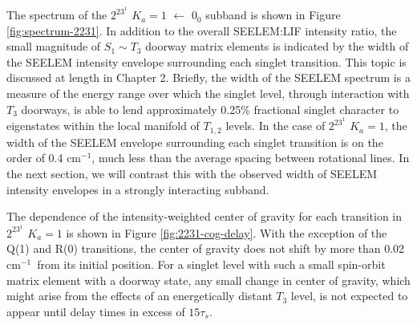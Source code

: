\documentclass[12pt]{mitthesis}
\newcommand{\rcm}{cm$^{-1}$}
\newcommand{\microsec}{$\mu$s}
\newcommand{\Ka}[1]{$K_a\!\!=\!#1$}
\begin{document}
The spectrum of the $2^23^1$ \Ka{1} $\leftarrow$ $0_0$ subband is
shown in Figure \ref{fig:spectrum-2231}.  In addition to the overall
SEELEM:LIF intensity ratio, the small magnitude of $S_1 \sim T_3$
doorway matrix elements is indicated by the width of the SEELEM
intensity envelope surrounding each singlet transition.  This topic is
discussed at length in Chapter 2.  Briefly, the width of the SEELEM
spectrum is a measure of the energy range over which the singlet
level, through interaction with $T_3$ doorways, is able to lend
approximately 0.25\% fractional singlet character to eigenstates
within the local manifold of $T_{1,2}$ levels.  In the case of
$2^23^1$ \Ka{1}, the width of the SEELEM envelope surrounding each
singlet transition is on the order of 0.4 \rcm, much less than the
average spacing between rotational lines.  In the next section, we
will contrast this with the observed width of SEELEM intensity
envelopes in a strongly interacting subband.


The dependence of the intensity-weighted center of gravity for each
transition in $2^23^1$ \Ka{1} is shown in Figure
\ref{fig:2231-cog-delay}.  With the exception of the Q(1) and R(0)
transitions, the center of gravity does not shift by more than 0.02
\rcm\ from its initial position.  For a singlet level with such a
small spin-orbit matrix element with a doorway state, any small change
in center of gravity, which might arise from the effects of an
energetically distant $T_3$ level, is not expected to appear until
delay times in excess of $15\tau_s$.
\end{document}

